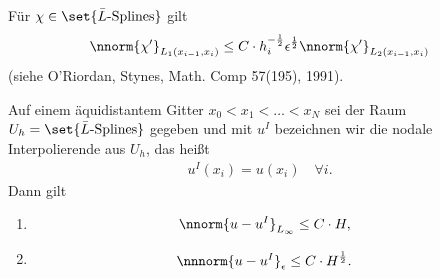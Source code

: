 \begin{bemerkung*}
  Für $\chi \in \set{\bar L\text{-Splines}}$ gilt
  \begin{align*}
    \nnorm{\chi'}_{L_{1}(x_{i-1}, x_{i})} \leq C\cdot h_{i}^{- \frac 12} \epsilon^{\frac 12}\nnorm{\chi'}_{L_{2}(x_{i-1}, x_{i})}
  \end{align*}
  (siehe O'Riordan, Stynes, Math. Comp 57(195), 1991). 
\end{bemerkung*}
\begin{lemma}\label{lem:6-4}
  Auf einem äquidistantem Gitter $x_{0}< x_{1}< \dots < x_{N}$ sei der Raum $U_{h} = \set{\bar L\text{-Splines}}$ gegeben und mit $u^{I}$ bezeichnen wir die nodale Interpolierende aus $U_{h}$, das heißt
  \begin{align*}
    u^{I}(x_{i}) = u(x_{i}) \quad \forall i. 
  \end{align*}
  Dann gilt
  \begin{enumerate}
  \item \begin{align*}
      \nnorm{u-u^{I}}_{L_{\infty}} &\leq C\cdot H, 
    \end{align*}
  \item
    \begin{align*}
      \nnnorm{u-u^{I}}_{\epsilon} &\leq  C\cdot H^{\frac 12}. 
    \end{align*}
  \end{enumerate}
\end{lemma}
